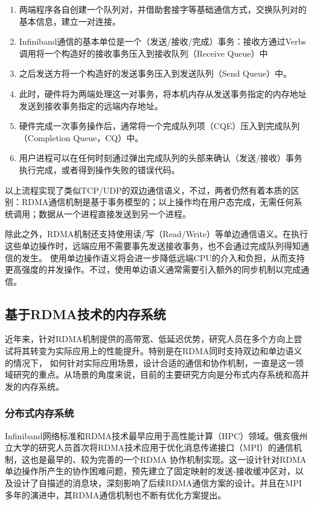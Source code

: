 \begin{enumerate}
	\item 两端程序各自创建一个队列对，并借助套接字等基础通信方式，交换队列对的基本信息，建立一对连接。
	\item Infiniband通信的基本单位是一个（发送/接收/完成）事务：接收方通过Verbs调用将一个构造好的接收事务压入到接收队列（Receive Queue）中
	\item 之后发送方将一个构造好的发送事务压入到发送队列（Send Queue）中。
	\item 此时，硬件将为两端处理这一对事务，将本机内存从发送事务指定的内存地址发送到接收事务指定的远端内存地址。
	\item 硬件完成一次事务操作后，通常将一个完成队列项（CQE）压入到完成队列（Completion Queue，CQ）中。
	\item 用户进程可以在任何时刻通过弹出完成队列的头部来确认（发送/接收）事务执行完成，或者得到操作失败的错误代码。
\end{enumerate}

以上流程实现了类似TCP/UDP的双边通信语义，不过，两者仍然有着本质的区别：RDMA通信机制是基于事务模型的；以上操作均在用户态完成，无需任何系统调用；数据从一个进程直接发送到另一个进程。

除此之外，RDMA机制还支持使用读/写（Read/Write）等单边通信语义。在执行这些单边操作时，远端应用不需要事先发送接收事务，也不会通过完成队列得知通信的发生。
使用单边操作语义将会进一步降低远端CPU的介入和负担，从而支持更高强度的并发操作。不过，使用单边语义通常需要引入额外的同步机制以完成通信。

\subsection{基于RDMA技术的内存系统}

近年来，针对RDMA机制提供的高带宽、低延迟优势，研究人员在多个方向上尝试将其转变为实际应用上的性能提升。特别是在RDMA同时支持双边和单边语义的情况下，
如何针对实际应用场景，设计合适的通信和协作机制，一直是这一领域研究的重点。从场景的角度来说，目前的主要研究方向是分布式内存系统和高并发的内存系统。

\subsubsection{分布式内存系统}

Infiniband网络标准和RDMA技术最早应用于高性能计算（HPC）领域。俄亥俄州立大学的研究人员\cite{liu2004high}首次将RDMA技术应用于优化消息传递接口（MPI）的通信机制，这也是最早的、较为完善的一个RDMA
协作机制实现。这一设计针对RDMA单边操作所产生的协作困难问题，预先建立了固定映射的发送-接收缓冲区对，以及设计了自描述的消息块，深刻影响了后续RDMA通信方案的设计\cite{mitchell2013using}\cite{kalia2014using}\cite{su2017rfp}。并且在MPI
多年的演进中，其RDMA通信机制也不断有优化方案提出\cite{sur2006rdma}\cite{wang2013gpu}。

